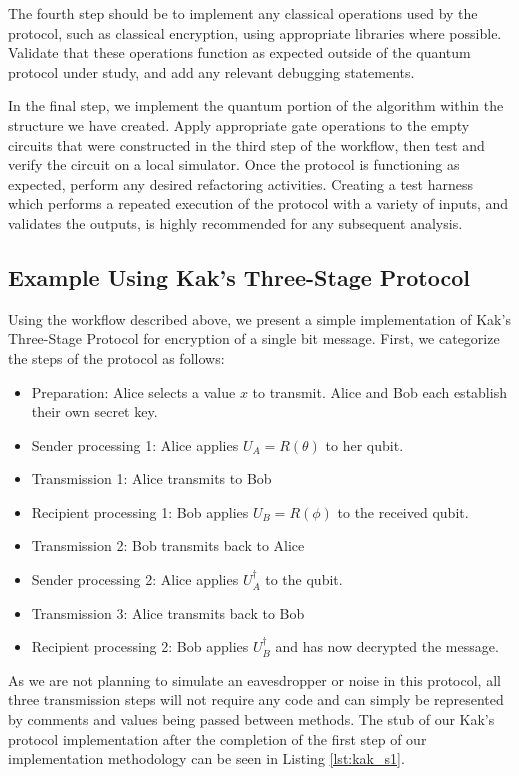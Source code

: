 \documentclass[sigconf]{acmart}
\begin{document}
The fourth step should be to implement any classical operations used by the protocol, such as classical encryption, using appropriate libraries where possible. Validate that these operations function as expected outside of the quantum protocol under study, and add any relevant debugging statements.

In the final step, we implement the quantum portion of the algorithm within the structure we have created. Apply appropriate gate operations to the empty circuits that were constructed in the third step of the workflow, then test and verify the circuit on a local simulator. Once the protocol is functioning as expected, perform any desired refactoring activities. Creating a test harness which performs a repeated execution of the protocol with a variety of inputs, and validates the outputs, is highly recommended for any subsequent analysis.

\subsection{Example Using Kak's Three-Stage Protocol}
Using the workflow described above, we present a simple implementation of Kak's Three-Stage Protocol\cite{kak_three-stage_2006} for encryption of a single bit message. First, we categorize the steps of the protocol as follows:
\begin{itemize}
\item Preparation: Alice selects a value $x$ to transmit. Alice and Bob each establish their own secret key.
\item Sender processing 1: Alice applies $U_A = R(\theta)$ to her qubit.
\item Transmission 1: Alice transmits to Bob
\item Recipient processing 1: Bob applies $U_B = R(\phi)$ to the received qubit.
\item Transmission 2: Bob transmits back to Alice
\item Sender processing 2: Alice applies $U^\dagger_A$ to the qubit.
\item Transmission 3: Alice transmits back to Bob
\item Recipient processing 2: Bob applies $U^\dagger_B$ and has now decrypted the message.
\end{itemize}
As we are not planning to simulate an eavesdropper or noise in this protocol, all three transmission steps will not require any code and can simply be represented by comments and values being passed between methods. The stub of our Kak's protocol implementation after the completion of the first step of our implementation methodology can be seen in Listing \ref{lst:kak_s1}.
\end{document}

